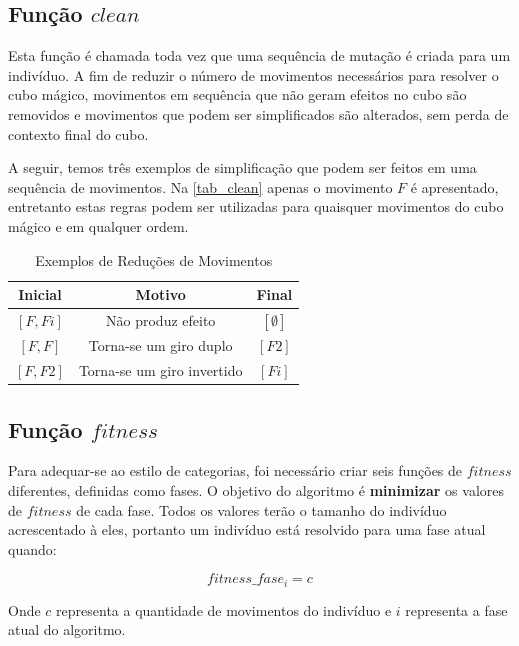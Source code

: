 \documentclass[12pt]{article}
\begin{document}
  \subsection{Função $clean$} \label{clean}
    Esta função é chamada toda vez que uma sequência de mutação é criada para um indivíduo. A fim de reduzir o número de movimentos necessários para resolver o cubo mágico, movimentos em sequência que não geram efeitos no cubo são removidos e movimentos que podem ser simplificados são alterados, sem perda de contexto final do cubo.
    
    A seguir, temos três exemplos de simplificação que podem ser feitos em uma sequência de movimentos. Na \autoref{tab_clean} apenas o movimento $F$ é apresentado, entretanto estas regras podem ser utilizadas para quaisquer movimentos do cubo mágico e em qualquer ordem.

    \begin{table}[ht]
      \centering
      \caption{Exemplos de Reduções de Movimentos} \label{tab_clean}
      \begin{tabular}{|c|c|c|}
        \hline
        \textbf{Inicial} & \textbf{Motivo}              & \textbf{Final}    \\ \hline
            $[F, Fi]$    &  Não produz efeito           &  $[\emptyset]$    \\ \hline
            $[F, F]$     &  Torna-se um giro duplo      &  $[F2]$           \\ \hline
            $[F, F2]$    &  Torna-se um giro invertido  &  $[Fi]$           \\ \hline
      \end{tabular}
    \end{table}

  \subsection{Função $fitness$} \label{fit}
    Para adequar-se ao estilo de categorias, foi necessário criar seis funções de $fitness$ diferentes, definidas como fases. O objetivo do algoritmo é \textbf{minimizar} os valores de $fitness$ de cada fase. Todos os valores terão o tamanho do indivíduo acrescentado à eles, portanto um indivíduo está resolvido para uma fase atual quando:

    \begin{equation}
    fitness\_fase_i = c
    \end{equation}

    Onde $c$ representa a quantidade de movimentos do indivíduo e $i$ representa a fase atual do algoritmo.
\end{document}

